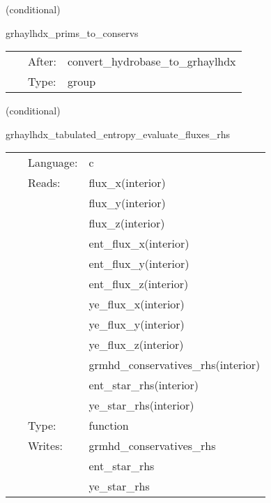 \vspace{5mm}

   (conditional) 

\hspace{5mm} grhaylhdx\_prims\_to\_conservs 

\hspace{5mm}{\it enforce simulation limits on primitives and compute conservatives } 


\hspace{5mm}

 \begin{tabular*}{160mm}{cll} 
~ & After:  & convert\_hydrobase\_to\_grhaylhdx \\ 
~ & Type:  & group \\ 
\end{tabular*} 


\vspace{5mm}

   (conditional) 

\hspace{5mm} grhaylhdx\_tabulated\_entropy\_evaluate\_fluxes\_rhs 

\hspace{5mm}{\it entropy+tabulated version of grhaylhdx\_evaluate\_fluxes\_rhs } 


\hspace{5mm}

 \begin{tabular*}{160mm}{cll} 
~ & Language:  & c \\ 
~ & Reads:  & flux\_x(interior) \\ 
~& ~ &flux\_y(interior)\\ 
~& ~ &flux\_z(interior)\\ 
~& ~ &ent\_flux\_x(interior)\\ 
~& ~ &ent\_flux\_y(interior)\\ 
~& ~ &ent\_flux\_z(interior)\\ 
~& ~ &ye\_flux\_x(interior)\\ 
~& ~ &ye\_flux\_y(interior)\\ 
~& ~ &ye\_flux\_z(interior)\\ 
~& ~ &grmhd\_conservatives\_rhs(interior)\\ 
~& ~ &ent\_star\_rhs(interior)\\ 
~& ~ &ye\_star\_rhs(interior)\\ 
~ & Type:  & function \\ 
~ & Writes:  & grmhd\_conservatives\_rhs \\ 
~& ~ &ent\_star\_rhs\\ 
~& ~ &ye\_star\_rhs\\ 
\end{tabular*} 


